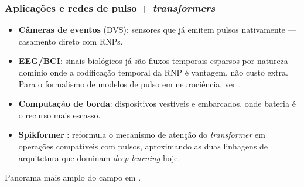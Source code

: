 \begin{frame}
	\frametitle{Aplicações e redes de pulso + \textit{transformers}}
	\begin{itemize}
		\item \textbf{Câmeras de eventos} (DVS): sensores que já emitem pulsos nativamente --- casamento direto com RNPs.
		\item \textbf{EEG/BCI}: sinais biológicos já são fluxos temporais esparsos por natureza --- domínio onde a codificação temporal da RNP é vantagem, não custo extra. Para o formalismo de modelos de pulso em neurociência, ver \cite{dan_goodman_2022_7044500}.
		\item \textbf{Computação de borda}: dispositivos vestíveis e embarcados, onde bateria é o recurso mais escasso.
		\item \textbf{Spikformer} \cite{zhou2023spikformer}: reformula o mecanismo de atenção do \textit{transformer} em operações compatíveis com pulsos, aproximando as duas linhagens de arquitetura que dominam \textit{deep learning} hoje.
	\end{itemize}
	\vspace{8pt}
	\par Panorama mais amplo do campo em \cite{roy2019towards}.
\end{frame}
